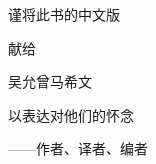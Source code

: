 
\cleardoublepage


\vspace*{2\baselineskip}

\begingroup
\centering
\Large\linespread{2}\kaishu

谨将此书的中文版

献\qquad 给

\medskip
{\huge 吴允曾\enskip 马希文}

以表达对他们的怀念

\hfill{\large\upshape\ttfamily ——作者、译者、编者\qquad}\null

\endgroup
